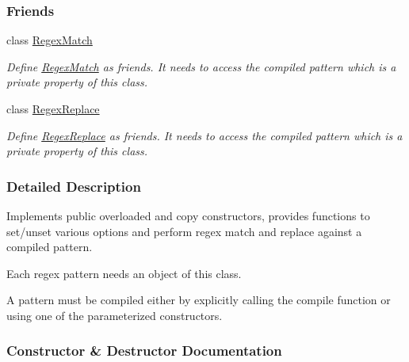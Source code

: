 \subsubsection*{Friends}
\begin{DoxyCompactItemize}
\item 
class \hyperlink{classjpcre2_1_1Regex_aaa8d9b93cf5a8b9ebbb78923a1494445}{Regex\+Match}\hypertarget{classjpcre2_1_1Regex_aaa8d9b93cf5a8b9ebbb78923a1494445}{}\label{classjpcre2_1_1Regex_aaa8d9b93cf5a8b9ebbb78923a1494445}

\begin{DoxyCompactList}\small\item\em Define \hyperlink{classjpcre2_1_1RegexMatch}{Regex\+Match} as friends. It needs to access the compiled pattern which is a private property of this class. \end{DoxyCompactList}\item 
class \hyperlink{classjpcre2_1_1Regex_a2547cb5380cbe0374ac0d44d34018dbb}{Regex\+Replace}\hypertarget{classjpcre2_1_1Regex_a2547cb5380cbe0374ac0d44d34018dbb}{}\label{classjpcre2_1_1Regex_a2547cb5380cbe0374ac0d44d34018dbb}

\begin{DoxyCompactList}\small\item\em Define \hyperlink{classjpcre2_1_1RegexReplace}{Regex\+Replace} as friends. It needs to access the compiled pattern which is a private property of this class. \end{DoxyCompactList}\end{DoxyCompactItemize}


\subsubsection{Detailed Description}
Implements public overloaded and copy constructors, provides functions to set/unset various options and perform regex match and replace against a compiled pattern. 

Each regex pattern needs an object of this class.

A pattern must be compiled either by explicitly calling the compile function or using one of the parameterized constructors. 

\subsubsection{Constructor \& Destructor Documentation}

